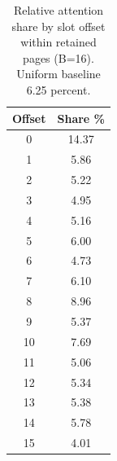\begin{table}[t]
\centering\small
\caption{Relative attention share by slot offset within retained pages (B=16). Uniform baseline 6.25 percent.}
\label{tab:page_fill}
\begin{tabular}{@{}cc@{}}
\toprule
Offset & Share \% \\
\midrule
0 & 14.37 \\
1 & 5.86 \\
2 & 5.22 \\
3 & 4.95 \\
4 & 5.16 \\
5 & 6.00 \\
6 & 4.73 \\
7 & 6.10 \\
8 & 8.96 \\
9 & 5.37 \\
10 & 7.69 \\
11 & 5.06 \\
12 & 5.34 \\
13 & 5.38 \\
14 & 5.78 \\
15 & 4.01 \\
\bottomrule
\end{tabular}
\end{table}
